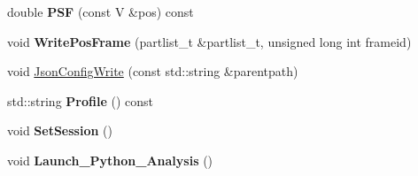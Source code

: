 \begin{DoxyCompactItemize}
double {\bfseries P\+SF} (const V \&pos) const
\item 
\mbox{\label{classLangevinBox_afa7c8ab2e1d424d7ee2b2540d6131fbd}} 
void {\bfseries Write\+Pos\+Frame} (partlist\+\_\+t \&partlist\+\_\+t, unsigned long int frameid)
\item 
void \hyperlink{classLangevinBox_ae76bedc64a1feb6576a2b2f09242d40c}{Json\+Config\+Write} (const std\+::string \&parentpath)
\item 
\mbox{\label{classLangevinBox_a559608899666d4bd8e9a583b6d3d67c6}} 
std\+::string {\bfseries Profile} () const
\item 
\mbox{\label{classLangevinBox_ad53a88aeb7241d381d1efa85a91c84fd}} 
void {\bfseries Set\+Session} ()
\item 
\mbox{\label{classLangevinBox_a97887f2c4d281242e05af79900119b24}} 
void {\bfseries Launch\+\_\+\+Python\+\_\+\+Analysis} ()
\end{DoxyCompactItemize}
